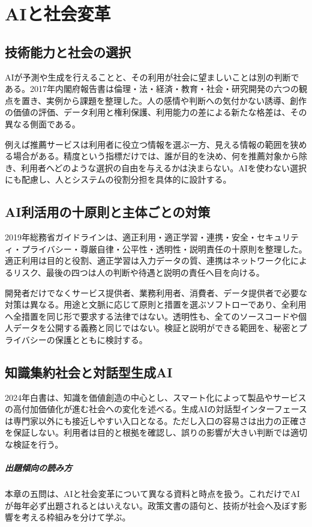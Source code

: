 \chapter{AIと社会変革}
\section{技術能力と社会の選択}
\label{theory:ai:society}
AIが予測や生成を行えることと、その利用が社会に望ましいことは別の判断である。2017年内閣府報告書は倫理・法・経済・教育・社会・研究開発の六つの観点を置き、実例から課題を整理した\parencite{ai_society2017}。人の感情や判断への気付かない誘導、創作の価値の評価、データ利用と権利保護、利用能力の差による新たな格差は、その異なる側面である。

例えば推薦サービスは利用者に役立つ情報を選ぶ一方、見える情報の範囲を狭める場合がある。精度という指標だけでは、誰が目的を決め、何を推薦対象から除き、利用者へどのような選択の自由を与えるかは決まらない。AIを使わない選択にも配慮し、人とシステムの役割分担を具体的に設計する。

\section{AI利活用の十原則と主体ごとの対策}
\label{theory:ai:principles}
2019年総務省ガイドラインは、適正利用・適正学習・連携・安全・セキュリティ・プライバシー・尊厳自律・公平性・透明性・説明責任の十原則を整理した\parencite{ai_use2019}。適正利用は目的と役割、適正学習は入力データの質、連携はネットワーク化によるリスク、最後の四つは人の判断や待遇と説明の責任へ目を向ける。

開発者だけでなくサービス提供者、業務利用者、消費者、データ提供者で必要な対策は異なる。用途と文脈に応じて原則と措置を選ぶソフトローであり、全利用へ全措置を同じ形で要求する法律ではない。透明性も、全てのソースコードや個人データを公開する義務と同じではない。検証と説明ができる範囲を、秘密とプライバシーの保護とともに検討する。

\section{知識集約社会と対話型生成AI}
\label{theory:ai:knowledge_society}
2024年白書は、知識を価値創造の中心とし、スマート化によって製品やサービスの高付加価値化が進む社会への変化を述べる\parencite{mext_ai_whitepaper2024}。生成AIの対話型インターフェースは専門家以外にも接近しやすい入口となる。ただし入口の容易さは出力の正確さを保証しない。利用者は目的と根拠を確認し、誤りの影響が大きい判断では適切な検証を行う。

\paragraph{出題傾向の読み方}
本章の五問は、AIと社会変革について異なる資料と時点を扱う。これだけでAIが毎年必ず出題されるとはいえない。政策文書の語句と、技術が社会へ及ぼす影響を考える枠組みを分けて学ぶ。


